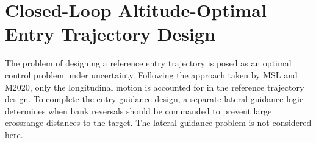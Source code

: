 \documentclass[journal ]{new-aiaa}
\newcommand{\state}{\ensuremath{\mathbf{x}}}
\newcommand{\mean}{\mathbf{m}}
\newcommand{\cov}{C}
\newcommand{\sample}{\ensuremath{\mathbf{z}}}
\begin{document}
% 




\section*{Closed-Loop Altitude-Optimal Entry Trajectory Design}
The problem of designing a reference entry trajectory is posed as an optimal control problem under uncertainty. Following the approach taken by MSL and M2020, only the longitudinal motion is accounted for in the reference trajectory design. To complete the entry guidance design, a separate lateral guidance logic determines when bank reversals should be commanded to prevent large crossrange distances to the target. The lateral guidance problem is not considered here.
\end{document}
